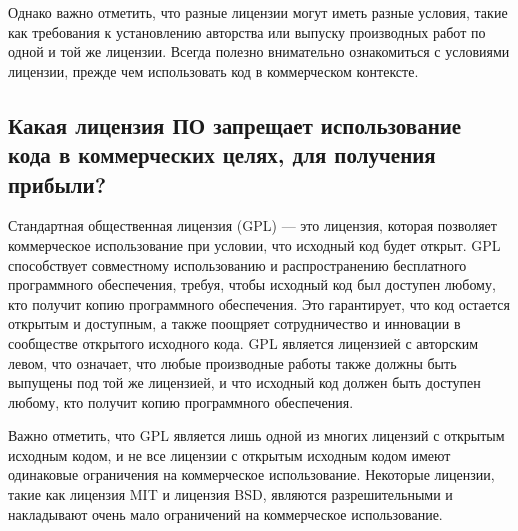 \documentclass[letterpaper,10pt,russian]{sphinxmanual}
\begin{document}
\sphinxAtStartPar
Однако важно отметить, что разные лицензии могут иметь разные условия, такие как требования к установлению авторства или выпуску производных работ по одной и той же лицензии. Всегда полезно внимательно ознакомиться с условиями лицензии, прежде чем использовать код в коммерческом контексте.


\subsection{Какая лицензия ПО запрещает использование кода в коммерческих целях, для получения прибыли?}
\label{\detokenize{educational_materials/open_license/content:id3}}
\sphinxAtStartPar
Стандартная общественная лицензия (GPL) — это лицензия, которая позволяет коммерческое использование при условии, что исходный код будет открыт. GPL способствует совместному использованию и распространению бесплатного программного обеспечения, требуя, чтобы исходный код был доступен любому, кто получит копию программного обеспечения. Это гарантирует, что код остается открытым и доступным, а также поощряет сотрудничество и инновации в сообществе открытого исходного кода. GPL является лицензией с авторским левом, что означает, что любые производные работы также должны быть выпущены под той же лицензией, и что исходный код должен быть доступен любому, кто получит копию программного обеспечения.

\sphinxAtStartPar
Важно отметить, что GPL является лишь одной из многих лицензий с открытым исходным кодом, и не все лицензии с открытым исходным кодом имеют одинаковые ограничения на коммерческое использование. Некоторые лицензии, такие как лицензия MIT и лицензия BSD, являются разрешительными и накладывают очень мало ограничений на коммерческое использование.
\end{document}
